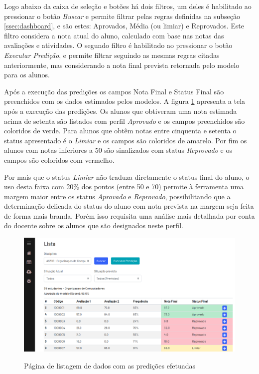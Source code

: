 Logo abaixo da caixa de seleção e botões há dois filtros, um deles é habilitado ao pressionar o botão \textit{Buscar} e permite filtrar pelas regras definidas na subseção \ref{ssec:dashboard}, e são estes: Aprovados, Média (ou limiar) e Reprovados. 
Este filtro considera a nota atual do aluno, calculado com base nas notas das avaliações e atividades.
O segundo filtro é habilitado ao pressionar o botão \textit{Executar Predição}, e permite filtrar seguindo as mesmas regras citadas anteriormente, mas considerando a nota final prevista retornada pelo modelo para os alunos.

Após a execução das predições os campos Nota Final e Status Final são preenchidos com os dados estimados pelos modelos. A figura \ref{fig:sistema-lista-2} apresenta a tela após a execução das predições.
Os alunos que obtiveram uma nota estimada acima de setenta são listados com perfil \textit{Aprovado} e os campos preenchidos são coloridos de verde. 
Para alunos que obtêm notas entre cinquenta e setenta o status apresentado é o \textit{Limiar} e os campos são coloridos de amarelo. 
Por fim os alunos com notas inferiores a 50 são sinalizados com status \textit{Reprovado} e os campos são coloridos com vermelho.

Por mais que o status \textit{Limiar} não traduza diretamente o status final do aluno, o uso desta faixa com 20\% dos pontos (entre 50 e 70) permite à ferramenta uma margem maior entre os status \textit{Aprovado} e \textit{Reprovado}, possibilitando que a determinação delicada do status do aluno com nota prevista na margem seja feita de forma mais branda. 
Porém isso requisita uma análise mais detalhada por conta do docente sobre os alunos que são designados neste perfil.

\begin{figure}[!htb]
    \centering
    \caption{Página de listagem de dados com as predições efetuadas}
    \includegraphics[width=1\textwidth]{./dados/figuras/sistema/sistema-lista-2}
    \label{fig:sistema-lista-2}
\end{figure}

